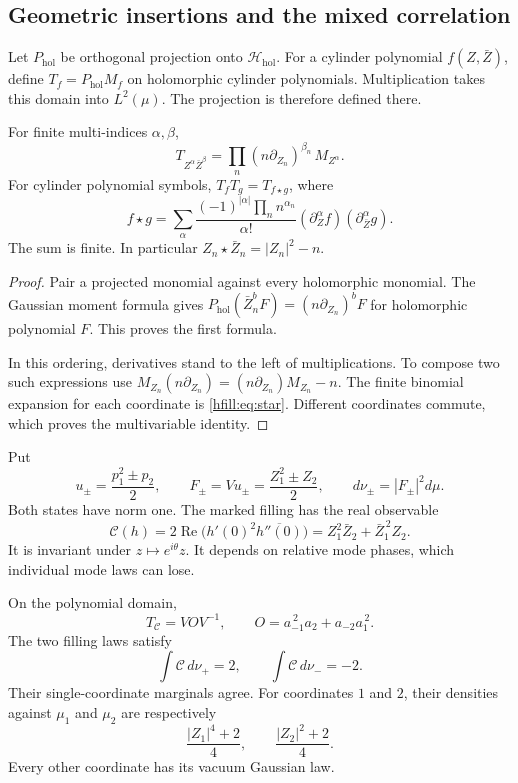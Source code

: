 \subsection{Geometric insertions and the mixed correlation}

Let $P_{\mathrm{hol}}$ be orthogonal projection onto
$\mathcal H_{\mathrm{hol}}$.
For a cylinder polynomial $f(Z,\bar Z)$, define
$T_f=P_{\mathrm{hol}}M_f$ on holomorphic cylinder polynomials.
Multiplication takes this domain into $L^2(\mu)$.
The projection is therefore defined there.

\begin{proposition}\label{hfill:prop:toeplitz}
For finite multi-indices $\alpha,\beta$,
\[
 T_{Z^\alpha\bar Z^\beta}
 =\prod_n(n\partial_{Z_n})^{\beta_n}\,M_{Z^\alpha}.
\]
For cylinder polynomial symbols, $T_fT_g=T_{f\star g}$, where
\begin{equation}\label{hfill:eq:star}
 f\star g=
 \sum_\alpha\frac{(-1)^{|\alpha|}\prod_n n^{\alpha_n}}{\alpha!}
       (\partial_Z^\alpha f)(\partial_{\bar Z}^\alpha g).
\end{equation}
The sum is finite.
In particular $Z_n\star\bar Z_n=|Z_n|^2-n$.
\end{proposition}

\begin{proof}
Pair a projected monomial against every holomorphic monomial.
The Gaussian moment formula gives
$P_{\mathrm{hol}}(\bar Z_n^b F)
=(n\partial_{Z_n})^bF$ for holomorphic polynomial $F$.
This proves the first formula.

In this ordering, derivatives stand to the left of multiplications.
To compose two such expressions use
$M_{Z_n}(n\partial_{Z_n})
=(n\partial_{Z_n})M_{Z_n}-n$.
The finite binomial expansion for each coordinate is
\eqref{hfill:eq:star}.
Different coordinates commute, which proves the multivariable identity.
\end{proof}

Put
\[
 u_\pm=\frac{p_1^2\pm p_2}{2},\qquad
 F_\pm=Vu_\pm=\frac{Z_1^2\pm Z_2}{2},\qquad
 d\nu_\pm=|F_\pm|^2d\mu.
\]
Both states have norm one.
The marked filling has the real observable
\begin{equation}\label{hfill:eq:mixed}
 \mathcal C(h)=2\operatorname{Re}
       \bigl(h'(0)^2\overline{h''(0)}\bigr)
 =Z_1^2\bar Z_2+\bar Z_1^{\,2}Z_2.
\end{equation}
It is invariant under $z\mapsto e^{i\theta}z$.
It depends on relative mode phases, which individual mode laws can lose.

\begin{proposition}\label{hfill:prop:mixed}
On the polynomial domain,
\[
 T_{\mathcal C}=VOV^{-1},\qquad
 O=a_{-1}^{\,2}a_2+a_{-2}a_1^{\,2}.
\]
The two filling laws satisfy
\begin{equation}\label{hfill:eq:expectations}
 \int\mathcal C\,d\nu_+=2,\qquad
 \int\mathcal C\,d\nu_-=-2.
\end{equation}
Their single-coordinate marginals agree.
For coordinates $1$ and $2$, their densities against $\mu_1$ and
$\mu_2$ are respectively
\[
 \frac{|Z_1|^4+2}{4},\qquad
 \frac{|Z_2|^2+2}{4}.
\]
Every other coordinate has its vacuum Gaussian law.
\end{proposition}

